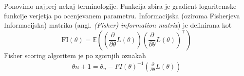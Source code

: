 \documentclass[12pt,a4paper]{amsart}
\theoremstyle{definition} %
\theoremstyle{plain} %
\begin{document}
Ponovimo najprej nekaj terminologije. Funkcija zbira je gradient logaritemske funkcije verjetja po ocenjevanem parametru.
Informacijska (oziroma Fisherjeva Informacijska) matrika (angl. \textit{(Fisher) information matrix}) je definirana kot 
\[
    \mathrm{FI}(\theta) = \mathbb{E}\left(\left(\frac{\partial}{\partial\theta} L(\theta)\right) \left(\frac{\partial}{\partial\theta} L(\theta)\right)^\top \right) %
\]
Fisher scoring algoritem je po zgornjih oznakah 
\begin{align}
    \theta{n + 1} = \theta_{n} - FI(\theta)^{-1}\left(\frac{\partial}{\partial\theta} L(\theta)\right)
\end{align}
%
\end{document}

